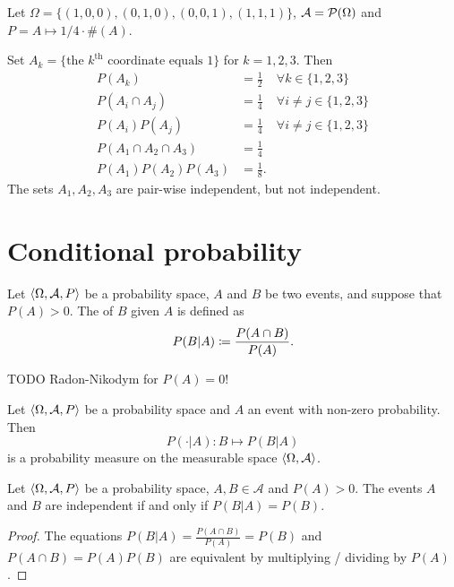 \begin{example}
Let $\Omega = \{(1, 0, 0), (0, 1, 0), (0, 0, 1), (1, 1, 1)\}$, $\mathcal{A} = \operatorname{\mathcal{P}}(\Omega)$ and $P = A\mapsto 1/4 \cdot \#(A)$.

Set $A_k = \{\text{the $k^\text{th}$ coordinate equals $1$}\}$ for $k=1,2,3$. Then
\begin{align*}
P(A_k) &= \frac{1}{2} & \forall k \in\{1,2,3\} \\
P(A_i\cap A_j) &= \frac{1}{4} & \forall i\neq j \in\{1,2,3\} \\
P(A_i)P(A_j) &= \frac{1}{4} & \forall i\neq j \in\{1,2,3\} \\
P(A_1\cap A_2 \cap A_3) &= \frac{1}{4} \\
P(A_1)P(A_2)P(A_3) &= \frac{1}{8}.
\end{align*}
The sets $A_1, A_2, A_3$ are pair-wise independent, but not independent.
\end{example}

\section{Conditional probability}
\begin{definition}
Let $\left\langle \Omega, \mathcal{A}, P \right\rangle$ be a probability space, $A$ and $B$ be two events, and suppose that $P(A) > 0$. The  of $B$ given $A$ is defined as
\[ P(B | A) \coloneqq \frac{P(A\cap B)}{P(A)}. \]
\end{definition}

TODO Radon-Nikodym for $P(A) = 0$!

\begin{lemma}
Let $\left\langle \Omega, \mathcal{A}, P \right\rangle$ be a probability space and $A$ an event with non-zero probability. Then
\[ P(\cdot | A): B\mapsto P(B | A) \]
is a probability measure on the measurable space $\left\langle \Omega, \mathcal{A} \right\rangle$.
\end{lemma}

\begin{lemma}
Let $\left\langle \Omega, \mathcal{A}, P \right\rangle$ be a probability space, $A, B \in \mathcal{A}$ and $P(A) > 0$. 
The events $A$ and $B$ are independent \textup{if and only if} $P(B|A) = P(B)$.
\end{lemma}
\begin{proof}
The equations $P(B|A) = \frac{P(A\cap B)}{P(A)} = P(B)$ and $P(A\cap B) = P(A)P(B)$ are equivalent by multiplying / dividing by $P(A)$.
\end{proof}


